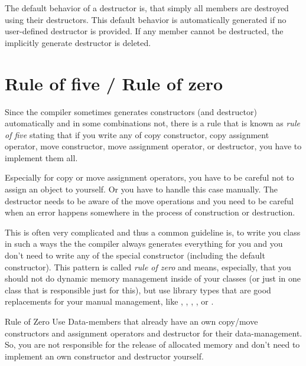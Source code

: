 The default behavior of a destructor is, that simply all members are destroyed using their destructors. This default behavior is automatically generated if
no user-defined destructor is provided. If any member cannot be destructed, the implicitly generate destructor is deleted.

\section{Rule of five / Rule of zero}

Since the compiler sometimes generates constructors (and destructor) automatically and in some combinations not, there is a rule that is known as
\emph{rule of five} stating that if you write any of copy constructor, copy assignment operator, move constructor, move assignment operator, or destructor,
you have to implement them all.

Especially for copy or move assignment operators, you have to be careful not to assign an object to yourself. Or you have to handle this case manually. The
destructor needs to be aware of the move operations and you need to be careful when an error happens somewhere in the process of construction or destruction.

This is often very complicated and thus a common guideline is, to write you class in such a ways the the compiler always generates everything for you and you
don't need to write any of the special constructor (including the default constructor). This pattern is called \emph{rule of zero} and means, especially,
that you should not do dynamic memory management inside of your classes (or just in one class that is responsible just for this), but use library types that
are good replacements for your manual management, like , , , , or .

\begin{guideline}{Rule of Zero}
  Use Data-members that already have an own copy/move constructors and assignment operators and destructor for their data-management. So, you are not
  responsible for the release of allocated memory and don't need to implement an own constructor and destructor yourself.
\end{guideline}


